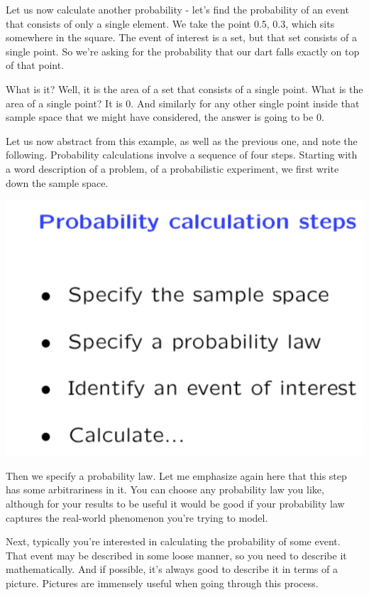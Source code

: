 \documentclass{tufte-handout}
\begin{document}
\vspace{0.7cm}
Let us now calculate another probability - let's find the probability of an event that consists of only a single element. We
take the point 0.5, 0.3, which sits somewhere in the square. The event of interest is a set, but that set consists of
a single point. So we're asking for the probability that our dart falls exactly on top of that point.

What is it? Well, it is the area of a set that consists of a single point. What is the area of a single point?
It is 0. And similarly for any other single point inside that sample space that we might have considered,
the answer is going to be 0.

\vspace{0.7cm}
Let us now abstract from this example, as well as the previous one, and note the following. Probability
calculations involve a sequence of four steps. Starting with a word description of a problem, of a
probabilistic experiment, we first write down the sample space. 

\begin{marginfigure}
  \includegraphics{StepsOfProbCalc}
\end{marginfigure}

Then we specify a probability law. Let me emphasize again here that this step has some arbitrariness in it. You can choose any probability
law you like, although for your results to be useful it would be good if your probability law captures the
real-world phenomenon you're trying to model.

 Next, typically you're interested in calculating the probability
of some event. That event may be described in some loose manner, so you need to describe it
mathematically. And if possible, it's always good to describe it in terms of a picture. Pictures are
immensely useful when going through this process.
\end{document}
